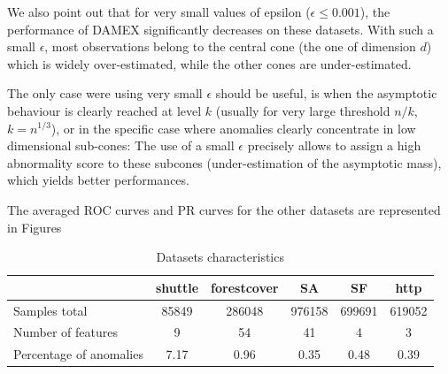 We also point out that for very small values of epsilon ($\epsilon \le 0.001$),
the performance of DAMEX significantly decreases on these datasets.
With such a small $\epsilon$, most observations belong to the central cone
(the one of dimension $d$) which is widely over-estimated, while the other cones are under-estimated.%

The only case were using very small $\epsilon$ should be useful, is when the asymptotic behaviour is
clearly reached at level $k$ (usually for very large threshold $n/k$, \eg~$k=n^{1/3}$), or in the
specific case where anomalies clearly concentrate in low dimensional sub-cones: The use of a small $\epsilon$ precisely allows
to assign a high abnormality score to these subcones (under-estimation of the asymptotic mass), which yields better performances.


The averaged ROC curves and PR curves for the other datasets are represented in Figures
\begin{table}[!ht]
\caption{Datasets characteristics}
\label{jmva:table:data}
\centering
\begin{tabular}{lccccc}
  \toprule
   ~                   & shuttle & forestcover & SA     & SF     & http    \\
  \midrule
  Samples total        & 85849   & 286048      & 976158 & 699691 & 619052  \\
  Number of features   & 9       & 54          & 41     & 4      & 3       \\
  Percentage of anomalies & 7.17    & 0.96        & 0.35   & 0.48   & 0.39 \\
\bottomrule
\end{tabular}
\end{table}

